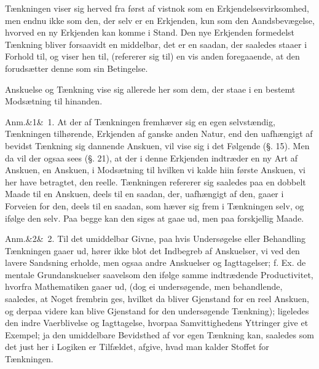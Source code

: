 \documentclass[12pt]{book}
\makeatletter
\def\sperr#1{#1}%
\def\textit#1{#1}%
\def\emph#1{#1}%
\newcommand{\sperr}[1]{\textls[180]{#1}}
\newcommand{\umph}[2][misc]{%
  \@ifundefined{umph@#1@on}{#2}{\emph{#2}}}
\newcommand{\anm}[1]{%
  \par\vspace{0.5\baselineskip}%
  \noindent\hspace{\parindent}\sperr{Anm.}\ifx&#1&\else~\textit{#1}.\fi
  \enspace\ignorespaces
}
\newcommand{\opage}[1]{\marginnote{\footnotesize\textit{[#1]}}}
\makeatother
\begin{document}
Tænkningen viser sig herved fra først af vistnok som en
Erkjendelsesvirksomhed, men endnu ikke som den, der selv er en Erkjenden, kun
som den Aandsbevægelse, hvorved en ny Erkjenden kan komme i Stand. Den nye
Erkjenden formedelst Tænkning bliver forsaavidt en \emph{middelbar}, det er en
saadan, der saaledes staaer
\opage{11} i Forhold til, og viser hen til, (refererer sig til) en vis anden
foregaaende, at den forudsætter denne som sin Betingelse.

Anskuelse og Tænkning vise sig allerede her som dem, der staae i en bestemt
Modsætning til hinanden.

\anm{1} At der af Tænkningen fremhæver sig en egen selvstændig, Tænkningen
tilhørende, Erkjenden af ganske anden Natur, end den uafhængigt af bevidst
Tænkning sig dannende Anskuen, vil vise sig i det Følgende (§. 15). Men da vil
der ogsaa sees (§. 21), at der i denne Erkjenden indtræder en ny Art af
Anskuen, en \umph[schwab]{intellectuel} Anskuen, i Modsætning til
hvilken vi kalde hiin første Anskuen, vi her have betragtet, \emph{den
reelle}. Tænkningen refererer sig saaledes paa en dobbelt Maade
til en Anskuen, deels til en saadan, der, uafhængigt af den, gaaer i Forveien
for den, deels til en saadan, som hæver sig frem i Tænkningen selv, og ifølge
den selv. Paa begge kan den siges at gaae ud, men paa forskjellig
Maade.

\anm{2} Til det umiddelbar Givne, paa hvis Undersøgelse eller Behandling
Tænkningen gaaer ud, hører ikke blot det Indbegreb af Anskuelser, vi ved den
lavere Sandsning erholde, men ogsaa andre Anskuelser og Iagttagelser; f. Ex.
de mentale Grundanskuelser saavelsom den ifølge samme indtrædende
Productivitet, hvorfra Mathematiken gaaer ud, (dog ei undersøgende, men
behandlende, saaledes, at Noget frembrin%
\opage{12}ges, hvilket da bliver Gjenstand for en reel Anskuen, og derpaa videre kan
blive Gjenstand for den undersøgende Tænkning); ligeledes den indre
Vaerblivelse og Iagttagelse, hvorpaa Samvittighedens Yttringer give et
Exempel; ja den umiddelbare Bevidsthed af vor egen Tænkning kan, saaledes som
det just her i Logiken er Tilfældet, afgive, hvad man kalder \emph{Stoffet}
for Tænkningen.
\end{document}
